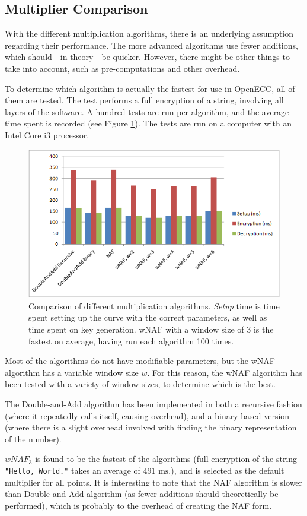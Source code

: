 \subsection{Multiplier Comparison}
\label{sec:performance_multipliers}

With the different multiplication algorithms, there is an underlying assumption regarding their performance. The more
advanced algorithms use fewer additions, which should - in theory - be quicker. However, there might be other things
to take into account, such as pre-computations and other overhead.

To determine which algorithm is actually the fastest for use in OpenECC, all of them are tested. The test performs a
full  encryption of a string, involving all layers of the software. A hundred tests are run per algorithm, and the
average time spent is recorded (see Figure \ref{fig:multipliers-comparison}). The tests are run on a computer with an
Intel Core i3 processor.

\begin{figure}[htb!]
	\centering
	\includegraphics[width=\textwidth]{performance/multipliers-comparison}
	\caption{Comparison of different multiplication algorithms. \emph{Setup} time is time spent setting up the curve with
        the correct parameters, as well as time spent on key generation. wNAF with a window size of 3 is the fastest on
        average, having run each algorithm 100 times.}
	\label{fig:multipliers-comparison}
\end{figure}

Most of the algorithms do not have modifiable parameters, but the wNAF algorithm has a variable window size \(w\). For
this reason, the wNAF algorithm has been tested with a variety of window sizes, to determine which is the best.

The Double-and-Add algorithm has been implemented in both a recursive fashion (where it repeatedly calls itself, causing
overhead), and a binary-based version (where there is a slight overhead involved with finding the binary representation
of the number).

\(wNAF_3\) is found to be the fastest of the algorithms (full encryption of the string \texttt{"Hello, World."} takes an
average of \(491 \text{ ms}\).), and is selected as the default multiplier for all points. It is
interesting to note that the NAF algorithm is slower than Double-and-Add algorithm (as fewer additions should theoretically
be performed), which is probably to the overhead of creating the NAF form.